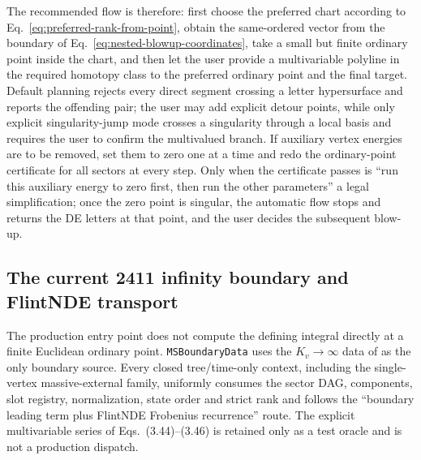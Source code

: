 \documentclass[11pt,a4paper]{article}
\begin{document}
The recommended flow is therefore: first choose the preferred chart according to Eq.~\eqref{eq:preferred-rank-from-point}, obtain the same-ordered vector from the boundary of Eq.~\eqref{eq:nested-blowup-coordinates}, take a small but finite ordinary point inside the chart, and then let the user provide a multivariable polyline in the required homotopy class to the preferred ordinary point and the final target. Default planning rejects every direct segment crossing a letter hypersurface and reports the offending pair; the user may add explicit detour points, while only explicit singularity-jump mode crosses a singularity through a local basis and requires the user to confirm the multivalued branch. If auxiliary vertex energies are to be removed, set them to zero one at a time and redo the ordinary-point certificate for all sectors at every step. Only when the certificate passes is ``run this auxiliary energy to zero first, then run the other parameters'' a legal simplification; once the zero point is singular, the automatic flow stops and returns the DE letters at that point, and the user decides the subsequent blow-up.

\subsection{The current 2411 infinity boundary and FlintNDE transport}

The production entry point does not compute the defining integral directly at a finite Euclidean ordinary point. \texttt{MSBoundaryData} uses the $K_v\to\infty$ data of \cite{Chen:2024jms} as the only boundary source. Every closed tree/time-only context, including the single-vertex massive-external family, uniformly consumes the sector DAG, components, slot registry, normalization, state order and strict rank and follows the ``boundary leading term plus FlintNDE Frobenius recurrence'' route. The explicit multivariable series of Eqs.~(3.44)--(3.46) is retained only as a test oracle and is not a production dispatch.
\end{document}
